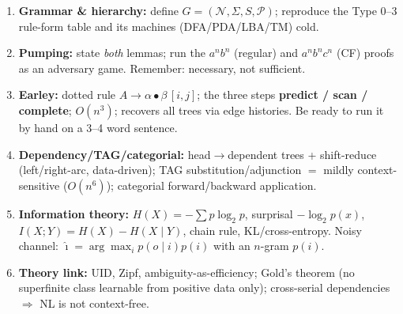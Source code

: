 \documentclass[11pt,a4paper]{article}
\begin{document}
\begin{must}
\begin{enumerate}[leftmargin=*,itemsep=2pt]
  \item \textbf{Grammar \& hierarchy:} define $G=(\mathcal N,\Sigma,S,\mathcal P)$; reproduce the Type 0--3 rule-form table and its machines (DFA/PDA/LBA/TM) cold.
  \item \textbf{Pumping:} state \emph{both} lemmas; run the $a^nb^n$ (regular) and $a^nb^nc^n$ (CF) proofs as an adversary game. Remember: necessary, not sufficient.
  \item \textbf{Earley:} dotted rule $A\to\alpha\bullet\beta\,[i,j]$; the three steps \textbf{predict / scan / complete}; $O(n^3)$; recovers all trees via edge histories. Be ready to run it by hand on a 3--4 word sentence.
  \item \textbf{Dependency/TAG/categorial:} head$\to$dependent trees + shift-reduce (left/right-arc, data-driven); TAG substitution/adjunction $=$ mildly context-sensitive ($O(n^6)$); categorial forward/backward application.
  \item \textbf{Information theory:} $H(X)=-\sum p\log_2 p$, surprisal $-\log_2 p(x)$, $I(X;Y)=H(X)-H(X\mid Y)$, chain rule, KL/cross-entropy. Noisy channel: $\hat\imath=\arg\max_i p(o\mid i)p(i)$ with an $n$-gram $p(i)$.
  \item \textbf{Theory link:} UID, Zipf, ambiguity-as-efficiency; Gold's theorem (no superfinite class learnable from positive data only); cross-serial dependencies $\Rightarrow$ NL is not context-free.
\end{enumerate}
\end{must}
\end{document}
